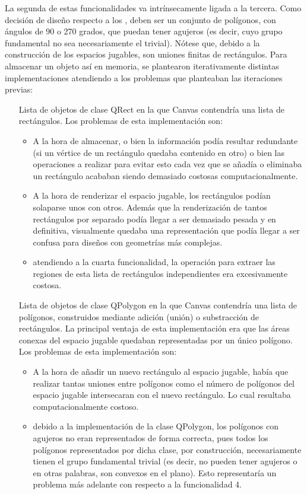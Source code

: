 La segunda de estas funcionalidades va intrínsecamente ligada a la tercera.
Como decisión de diseño respecto a los , deben ser un conjunto de polígonos, con ángulos de 90 o 270 grados, que puedan tener agujeros (es decir, cuyo grupo fundamental no sea necesariamente el trivial). Nótese que, debido a la construcción de los espacios jugables, son uniones finitas de rectángulos.
Para almacenar un objeto así en memoria, se plantearon iterativamente distintas implementaciones atendiendo a los problemas que planteaban las iteraciones previas:
\begin{enumerate}
	\item[Lista de objetos de clase QRect] en la que Canvas contendría una lista de rectángulos. Los problemas de esta implementación son:
	\begin{itemize}
		\item A la hora de almacenar, o bien la información podía resultar redundante (si un vértice de un rectángulo quedaba contenido en otro) o bien las operaciones a realizar para evitar esto cada vez que se añadía o eliminaba un rectángulo acababan siendo demasiado costosas computacionalmente.
		\item A la hora de renderizar el espacio jugable, los rectángulos podían solaparse unos con otros. Además que la renderización de tantos rectángulos por separado podía llegar a ser demasiado pesada y en definitiva, visualmente quedaba una representación que podía llegar a ser confusa para diseños con geometrías más complejas.
		\item atendiendo a la cuarta funcionalidad, la operación para extraer las regiones de esta lista de rectángulos independientes era excesivamente costosa.
	\end{itemize}
	\item[Lista de objetos de clase QPolygon] en la que Canvas contendría una lista de polígonos, construidos mediante adición (unión) o substracción de rectángulos. La principal ventaja de esta implementación era que las áreas conexas del espacio jugable quedaban representadas por un único polígono. Los problemas de esta implementación son:
	\begin{itemize}
		\item A la hora de añadir un nuevo rectángulo al espacio jugable, había que realizar tantas uniones entre polígonos como el número de polígonos del espacio jugable intersecaran con el nuevo rectángulo. Lo cual resultaba computacionalmente costoso.
		\item debido a la implementación de la clase QPolygon, los polígonos con agujeros no eran representados de forma correcta, pues todos los polígonos representados por dicha clase, por construcción, necesariamente tienen el grupo fundamental trivial (es decir, no pueden tener agujeros o en otras palabras, son convexos en el plano). Esto representaría un problema más adelante con respecto a la funcionalidad 4.

\end{itemize}
\end{enumerate}
